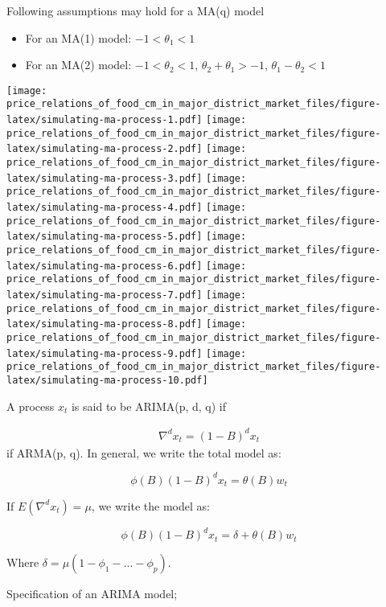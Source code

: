 \documentclass[12pt,]{article}
\providecommand{\tightlist}{%
  \setlength{\itemsep}{0pt}\setlength{\parskip}{0pt}}
\begin{document}
Following assumptions may hold for a MA(q) model

\begin{itemize}
\tightlist
\item
  For an MA(1) model: \(-1 < \theta_1 < 1\)
\item
  For an MA(2) model: \(-1 < \theta_2 < 1\), \(\theta_2 + \theta_1 > -1\), \(\theta_1 - \theta_2 < 1\)
\end{itemize}

\texttt{[image: price\_relations\_of\_food\_cm\_in\_major\_district\_market\_files/figure-latex/simulating-ma-process-1.pdf]} \texttt{[image: price\_relations\_of\_food\_cm\_in\_major\_district\_market\_files/figure-latex/simulating-ma-process-2.pdf]} \texttt{[image: price\_relations\_of\_food\_cm\_in\_major\_district\_market\_files/figure-latex/simulating-ma-process-3.pdf]} \texttt{[image: price\_relations\_of\_food\_cm\_in\_major\_district\_market\_files/figure-latex/simulating-ma-process-4.pdf]} \texttt{[image: price\_relations\_of\_food\_cm\_in\_major\_district\_market\_files/figure-latex/simulating-ma-process-5.pdf]} \texttt{[image: price\_relations\_of\_food\_cm\_in\_major\_district\_market\_files/figure-latex/simulating-ma-process-6.pdf]} \texttt{[image: price\_relations\_of\_food\_cm\_in\_major\_district\_market\_files/figure-latex/simulating-ma-process-7.pdf]} \texttt{[image: price\_relations\_of\_food\_cm\_in\_major\_district\_market\_files/figure-latex/simulating-ma-process-8.pdf]} \texttt{[image: price\_relations\_of\_food\_cm\_in\_major\_district\_market\_files/figure-latex/simulating-ma-process-9.pdf]} \texttt{[image: price\_relations\_of\_food\_cm\_in\_major\_district\_market\_files/figure-latex/simulating-ma-process-10.pdf]}

A process \(x_t\) is said to be ARIMA(p, d, q) if

\[
\label{eqn:arima}
\begin{aligned}
  \nabla^d x_t = ( 1- B)^d x_t
\end{aligned}
\]
if ARMA(p, q). In general, we write the total model as:

\[
\label{eqn:arima-total}
\phi (B)(1-B)^d x_t = \theta (B)w_t
\]

If \(E (\nabla^d x_t) = \mu\), we write the model as:

\[
\label{eqn:arima-full}
\phi(B)(1-B)^d x_t = \delta + \theta (B) w_t
\]

Where \(\delta = \mu (1-\phi_1 - ... - \phi_p )\).

Specification of an ARIMA model;
\end{document}

